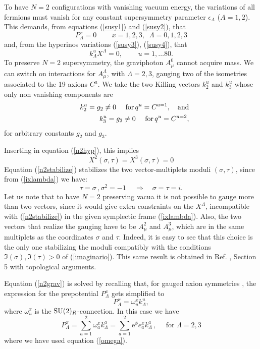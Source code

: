\documentclass[a4paper,12pt]{article}
\begin{document}
To have $N=2$ configurations with vanishing vacuum energy, the
variations of all fermions must vanish for any constant
supersymmetry parameter $\epsilon_A$ ($A=1,2$). This demands, from
equations (\ref{susy1}) and (\ref{susy2}), that
\begin{equation}
P^x_\Lambda =0 \qquad  \, x=1,2,3, \;\;\Lambda=0,1,2,3
\label{n2grav}
\end{equation}
 and, from the hyperinos variations (\ref{susy3}),
(\ref{susy4}), that
\begin{equation}
k^u_\Lambda X^\Lambda =0, \qquad \, u=1,\dots 80. \label{n2hyp}
\end{equation}
To preserve $N=2$ supersymmetry, the graviphoton $A^0_\mu$ cannot
acquire mass. We can switch on interactions for $A^\Lambda_\mu$,
with $\Lambda =2,3$, gauging two of the isometries associated to
the 19 axions $C^a$. We take the two Killing vectors $k_2^u$ and
$k_3^u$ whose only  non vanishing components are
\begin{eqnarray*}&&k^u_2=g_2\neq 0 \quad \hbox{ for}\, q^u=C^{a=1},
\quad \mathrm{and}\\&& k^u_3=g_3\neq 0 \quad \hbox{ for}\,
q^u=C^{a=2},\end{eqnarray*} for arbitrary constants $g_2$ and
$g_3$.



  Inserting in equation
(\ref{n2hyp}), this implies
\begin{equation}
X^2(\sigma,\tau ) = X^3(\sigma,\tau )=0\label{n2stabilize}
\end{equation}
Equation (\ref{n2stabilize}) stabilizes the two vector-multiplets
moduli $(\sigma,\tau)$, since from (\ref{ixlambda}) we have:
$$\tau =\sigma \, , \sigma^2 =-1 \,\quad \Longrightarrow \quad \sigma=\tau
=i.$$ Let us note that to have $N=2$ preserving vacua it is not
possible to gauge more than two vectors, since it would give extra
constraints on the $X^\Lambda$, incompatible with
(\ref{n2stabilize}) in the given symplectic frame
(\ref{ixlambda}). Also, the two vectors that realize the gauging
have to be $A^2_\mu$ and $A_\mu^3$, which are in the same
multiplets as the coordinates $\sigma$ and $\tau$. Indeed, it is
easy to see that this choice is the only one stabilizing the
moduli compatibly with the conditions $\Im(\sigma), \Im(\tau)>0$
of (\ref{imaginario}). This same result is obtained in Ref.
\cite{tt}, Section 5 with topological arguments.

 Equation (\ref{n2grav}) is solved by
recalling that, for gauged axion symmetries \cite{mi,da}, the
expression for the prepotential $P^x_\Lambda$ gets simplified to
$$P^x_\Lambda = \omega^x_u k^u_\Lambda ,$$
where $\omega^x_u $ is the $\mathrm{SU}(2)_R$-connection. In this case we
have
$$P^x_\Lambda = \sum_{a=1}^2\omega^x_a k^a_\Lambda =
\sum_{a=1}^2\mathrm{e}^\phi e^x_a k^a_\Lambda\,, \quad\mbox{ for }
\Lambda=2,3$$ where we have used equation (\ref{omega}).
\end{document}
